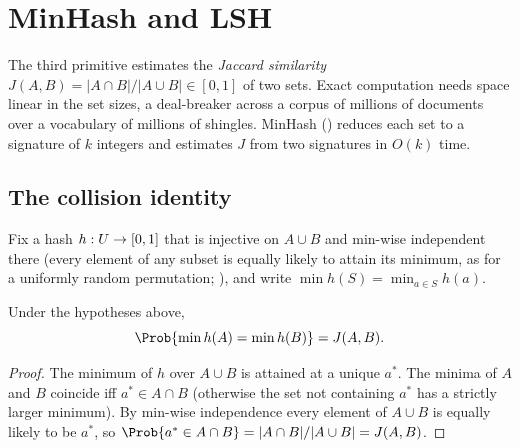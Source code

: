 %

\section{MinHash and LSH}
\label{sec:minhash-lsh}

The third primitive estimates the \emph{Jaccard similarity} $J(A, B) = |A \cap
B|/|A \cup B| \in [0,1]$ of two sets. Exact computation needs space linear in
the set sizes, a deal-breaker across a corpus of millions of documents over a
vocabulary of millions of shingles. MinHash (\textcite{broder-1997}) reduces
each set to a signature of $k$ integers and estimates $J$ from two signatures in
$O(k)$ time.

\subsection*{The collision identity}

Fix a hash $h : U \to [0,1]$ that is injective on $A \cup B$ and
min-wise independent there (every element of any subset is equally likely to
attain its minimum, as for a uniformly random permutation;
\textcite{broder-et-al-2000}), and write $\min h(S) = \min_{a \in S} h(a)$.

\begin{proposition}
\label{prop:minhash-collision}
Under the hypotheses above,
\[
  \Prob{\min h(A) = \min h(B)} = J(A, B).
\]
\end{proposition}

\begin{proof}
The minimum of $h$ over $A \cup B$ is attained at a unique $a^*$. The minima of
$A$ and $B$ coincide iff $a^* \in A \cap B$ (otherwise the set not containing
$a^*$ has a strictly larger minimum). By min-wise independence every element of
$A \cup B$ is equally likely to be $a^*$, so $\Prob{a^* \in A \cap B} = |A \cap B|/|A \cup
B| = J(A, B)$.
\end{proof}

